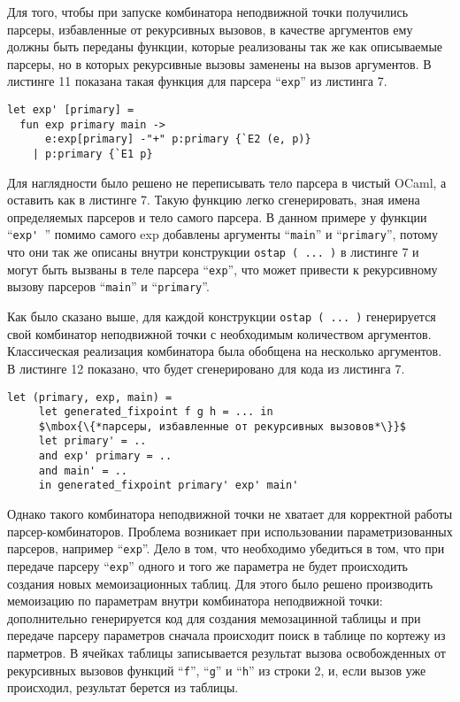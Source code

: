 Для того, чтобы при запуске комбинатора неподвижной точки получились парсеры, избавленные от рекурсивных вызовов, в качестве аргументов ему должны быть переданы функции, которые реализованы так же как описываемые парсеры, но в которых рекурсивные вызовы заменены на вызов аргументов. В листинге 11 показана такая функция для парсера ``\lstinline|exp|'' из листинга 7.

\begin{lstlisting}[basicstyle=\small, caption=Парсеры без рекурсивных вызовов]
let exp' [primary] =
  fun exp primary main ->
      e:exp[primary] -"+" p:primary {`E2 (e, p)}
    | p:primary {`E1 p}
\end{lstlisting}

Для наглядности было решено не переписывать тело парсера в чистый OCaml, а оставить как в листинге 7. Такую функцию легко сгенерировать, зная имена определяемых парсеров и тело самого парсера. В данном примере у функции ``\lstinline|exp' |'' помимо самого exp добавлены аргументы ``\lstinline|main|'' и ``\lstinline|primary|'', потому что они так же описаны внутри конструкции \lstinline|ostap ( ... )| в листинге 7 и могут быть вызваны в теле парсера ``\lstinline|exp|'', что может привести к рекурсивному вызову парсеров ``\lstinline|main|'' и ``\lstinline|primary|''.

Как было сказано выше, для каждой конструкции \lstinline|ostap ( ... )| генерируется свой комбинатор неподвижной точки с необходимым количеством аргументов. Классическая реализация комбинатора была обобщена на несколько аргументов. В листинге 12 показано, что будет сгенерировано для кода из листинга 7.

\begin{lstlisting}[basicstyle=\small, caption=Код комбинатора неподвижной точки]
   let (primary, exp, main) =
     let generated_fixpoint f g h = ... in
     $\mbox{\{*парсеры, избавленные от рекурсивных вызовов*\}}$
     let primary' = ..
     and exp' primary = ..
     and main' = ..
     in generated_fixpoint primary' exp' main'
\end{lstlisting}

Однако такого  комбинатора неподвижной точки не хватает для корректной работы парсер-комбинаторов. Проблема возникает при использовании параметризованных парсеров, например ``\lstinline|exp|''. Дело в том, что необходимо убедиться в том, что при передаче парсеру ``\lstinline|exp|'' одного и того же параметра не будет происходить создания новых мемоизационных таблиц. Для этого было решено производить мемоизацию по параметрам внутри комбинатора неподвижной точки: дополнительно генерируется код для создания мемозацинной таблицы и при передаче парсеру параметров сначала происходит поиск в таблице по кортежу из парметров. В ячейках таблицы записывается результат вызова освобожденных от рекурсивных вызовов функций ``\lstinline|f|'', ``\lstinline|g|'' и ``\lstinline|h|'' из строки 2, и, если вызов уже происходил, результат берется из таблицы.


